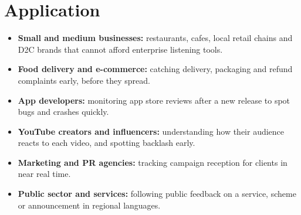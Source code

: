 \documentclass[12pt,a4paper]{report}
\makeatletter
\def\@makechapterhead#1{%
  \vspace*{\fill}%
  \begin{center}
    {\Huge\bfseries CHAPTER \thechapter\\[1.5ex]#1}
  \end{center}
  \thispagestyle{chaptertitle}%
  \vspace*{\fill}
  \clearpage
}
\makeatother
\begin{document}
\section{Application}

\begin{itemize}
    \item \textbf{Small and medium businesses:} restaurants, cafes, local retail chains and D2C brands that cannot afford enterprise listening tools.
    \item \textbf{Food delivery and e-commerce:} catching delivery, packaging and refund complaints early, before they spread.
    \item \textbf{App developers:} monitoring app store reviews after a new release to spot bugs and crashes quickly.
    \item \textbf{YouTube creators and influencers:} understanding how their audience reacts to each video, and spotting backlash early.
    \item \textbf{Marketing and PR agencies:} tracking campaign reception for clients in near real time.
    \item \textbf{Public sector and services:} following public feedback on a service, scheme or announcement in regional languages.
\end{itemize}

\clearpage
{}
\pagestyle{empty}

\makeatletter
\renewcommand{\@chapapp}{Annexure}
\renewcommand{\thechapter}{\Alph{chapter}}
\makeatother

\makeatletter
\renewcommand{\@makechapterhead}[1]{%
  \vspace*{\fill}%
  \begin{center}
    {\Huge\bfseries Annexure \thechapter\\[1.5ex]#1}
  \end{center}
  \thispagestyle{chaptertitle}%
  \vspace*{\fill}
  \clearpage
}
\makeatother
\end{document}
